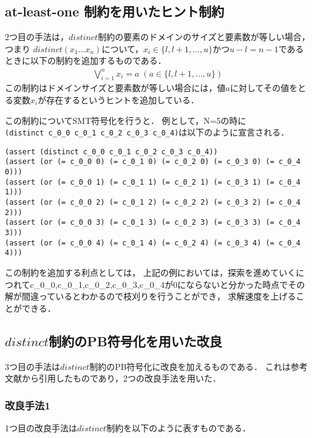 \subsection{at-least-one 制約を用いたヒント制約}\label{sec:pro_hint_2}
2つ目の手法は，$distinct$制約の要素のドメインのサイズと要素数が等しい場合，つまり
$distinct(x_1 ... x_n)$について，$x_i \in \{l, l+1, ..., u\}$かつ$u-l=n-1$であるときに以下の制約を追加するものである．\\
\begin{eqnarray}
\bigvee_{i=1}^n x_i=a \; (a \in \{l, l+1, ..., u\})
\label{eq:pro_h2}
\end{eqnarray}
この制約はドメインサイズと要素数が等しい場合には，値$a$に対してその値をとる変数$x_i$が存在するというヒントを追加している．

この制約についてSMT符号化を行うと．
例として，N=5の時に\\
\verb|(distinct c_0_0 c_0_1 c_0_2 c_0_3 c_0_4)|は以下のように宣言される．

{ \footnotesize \begin{verbatim}
(assert (distinct c_0_0 c_0_1 c_0_2 c_0_3 c_0_4))
(assert (or (= c_0_0 0) (= c_0_1 0) (= c_0_2 0) (= c_0_3 0) (= c_0_4 0)))
(assert (or (= c_0_0 1) (= c_0_1 1) (= c_0_2 1) (= c_0_3 1) (= c_0_4 1)))
(assert (or (= c_0_0 2) (= c_0_1 2) (= c_0_2 2) (= c_0_3 2) (= c_0_4 2)))
(assert (or (= c_0_0 3) (= c_0_1 3) (= c_0_2 3) (= c_0_3 3) (= c_0_4 3)))
(assert (or (= c_0_0 4) (= c_0_1 4) (= c_0_2 4) (= c_0_3 4) (= c_0_4 4)))
\end{verbatim}}


この制約を追加する利点としては，
上記の例においては，探索を進めていくにつれてc\_0\_0,c\_0\_1,c\_0\_2,c\_0\_3,c\_0\_4が0にならないと分かった時点でその解が間違っているとわかるので枝刈りを行うことができ，
求解速度を上げることができる．


\subsection{$distinct$制約のPB符号化を用いた改良}\label{sec:pro_hint_3}
3つ目の手法は$distinct$制約のPB符号化に改良を加えるものである．
これは参考文献\cite{Ono19:ai}から引用したものであり，2つの改良手法を用いた．


\subsubsection{改良手法1}\label{sec:pro_hint_3_1}
1つ目の改良手法は$distinct$制約を以下のように表すものである．

